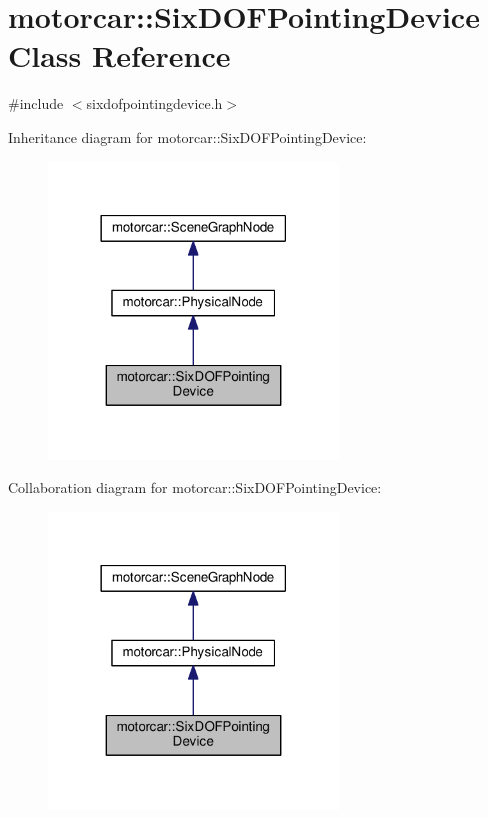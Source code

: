 \hypertarget{classmotorcar_1_1SixDOFPointingDevice}{\section{motorcar\-:\-:Six\-D\-O\-F\-Pointing\-Device Class Reference}
\label{classmotorcar_1_1SixDOFPointingDevice}
}


{\ttfamily \#include $<$sixdofpointingdevice.\-h$>$}



Inheritance diagram for motorcar\-:\-:Six\-D\-O\-F\-Pointing\-Device\-:
\nopagebreak
\begin{figure}[H]
\begin{center}
\leavevmode
\includegraphics[width=218pt]{classmotorcar_1_1SixDOFPointingDevice__inherit__graph}
\end{center}
\end{figure}


Collaboration diagram for motorcar\-:\-:Six\-D\-O\-F\-Pointing\-Device\-:
\nopagebreak
\begin{figure}[H]
\begin{center}
\leavevmode
\includegraphics[width=218pt]{classmotorcar_1_1SixDOFPointingDevice__coll__graph}
\end{center}
\end{figure}
